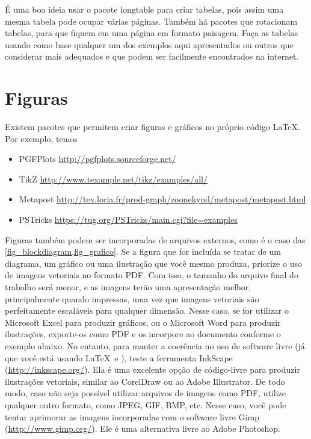 É uma boa ideia usar o pacote \textsf{longtable} para criar tabelas, pois assim uma mesma tabela pode ocupar várias páginas. Também há pacotes que rotacionam tabelas, para que fiquem em uma página em formato paisagem. Faça as tabelas usando como base qualquer um dos exemplos aqui apresentados ou outros que considerar mais adequados e que podem ser facilmente encontrados na internet.

\section{Figuras}

Existem pacotes que permitem criar figuras e gráficos no próprio código \LaTeX. Por exemplo, temos

\begin{itemize}
    \item PGFPlots \url{http://pgfplots.sourceforge.net/}
    \item TikZ \url{http://www.texample.net/tikz/examples/all/}
    \item Metapost \url{http://tex.loria.fr/prod-graph/zoonekynd/metapost/metapost.html}
    \item PSTricks \url{https://tug.org/PSTricks/main.cgi?file=examples}
\end{itemize}

Figuras também podem ser incorporadas de arquivos externos, como é o caso das \cref{fig_blockdiagram,fig_grafico}. Se a figura que for incluída se tratar de um diagrama, um gráfico ou uma ilustração que você mesmo produza, priorize o uso de imagens vetoriais no formato PDF. Com isso, o tamanho do arquivo final do trabalho será menor, e as imagens terão uma apresentação melhor, principalmente quando impressas, uma vez que imagens vetoriais são perfeitamente escaláveis para qualquer dimensão. Nesse caso, se for utilizar o Microsoft Excel para produzir gráficos, ou o Microsoft Word para produzir ilustrações, exporte-os como PDF e os incorpore ao documento conforme o exemplo abaixo. No entanto, para manter a coerência no uso de software livre (já que você está usando \LaTeX\ e \abnTeX), teste a ferramenta \textsf{InkScape} (\url{http://inkscape.org/}). Ela é uma excelente opção de código-livre para produzir ilustrações vetoriais, similar ao CorelDraw ou ao Adobe Illustrator. De todo modo, caso não seja possível utilizar arquivos de imagens como PDF, utilize qualquer outro formato, como JPEG, GIF, BMP, etc. Nesse caso, você pode tentar aprimorar as imagens incorporadas com o software livre \textsf{Gimp} (\url{http://www.gimp.org/}). Ele é uma alternativa livre ao Adobe Photoshop.

